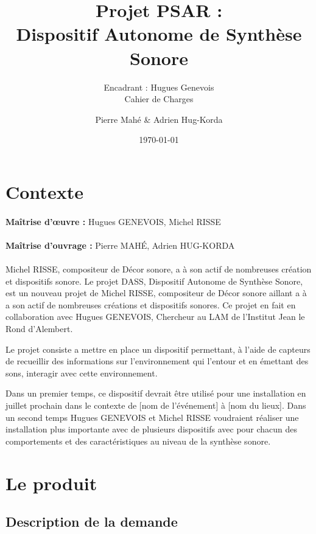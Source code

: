 \documentclass[a4paper, titlepage, oneside, 12pt]{article}%
\title{Projet PSAR :\\ Dispositif Autonome de Synthèse Sonore}
\subtitle{Encadrant : Hugues Genevois \\ Cahier de Charges}
\author{Pierre Mahé \& Adrien Hug-Korda}
\date{\today}
\begin{document}
 
\maketitle 
\tableofcontents

\newpage

\section{Contexte}

\paragraph{}
\textbf{Maîtrise d’œuvre :} Hugues GENEVOIS, Michel RISSE
\vspace{-5mm}
\paragraph{}
\textbf{Maîtrise d’ouvrage :} Pierre MAHÉ, Adrien HUG-KORDA 

\paragraph{}
Michel RISSE, compositeur de Décor sonore, a à son actif de nombreuses création et dispositifs sonore.
Le projet DASS, Dispositif Autonome de Synthèse Sonore, est un nouveau projet de Michel RISSE, compositeur de Décor sonore aillant a à a son actif de nombreuses créations et dispositifs sonores. Ce projet en fait en collaboration avec Hugues GENEVOIS, Chercheur au LAM de l’Institut Jean le Rond d’Alembert.

Le projet consiste a mettre en place un dispositif permettant, à l'aide de capteurs de recueillir des informations sur l'environnement qui l’entour et en émettant des sons, interagir avec cette environnement. 

Dans un premier temps, ce dispositif devrait être utilisé pour une installation en juillet prochain dans le contexte de [nom de l’événement] à [nom du lieux].
Dans un second temps Hugues GENEVOIS et Michel RISSE voudraient réaliser une installation plus importante avec de plusieurs dispositifs avec pour chacun des comportements et des caractéristiques au niveau de la synthèse sonore. 

\section{Le produit}
\subsection{Description de la demande}
\end{document}
